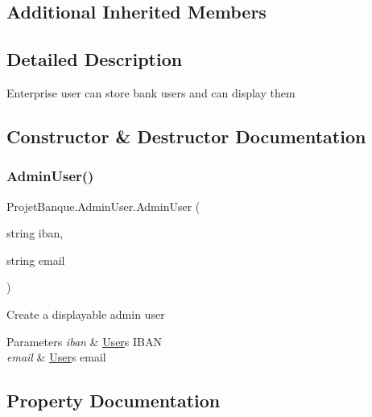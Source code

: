 \subsection*{Additional Inherited Members}


\subsection{Detailed Description}
Enterprise user can store bank users and can display them 



\subsection{Constructor \& Destructor Documentation}
\mbox{\label{class_projet_banque_1_1_admin_user_a1ab74cd3e86e062f55b3d860eb9c6356}} 
\subsubsection{\texorpdfstring{AdminUser()}{AdminUser()}}
{\footnotesize\ttfamily Projet\+Banque.\+Admin\+User.\+Admin\+User (\begin{DoxyParamCaption}\item[{string}]{iban,  }\item[{string}]{email }\end{DoxyParamCaption})}



Create a displayable admin user 


\begin{DoxyParams}{Parameters}
{\em iban} & \mbox{\hyperlink{class_projet_banque_1_1_user}{User}}\textquotesingle{}s I\+B\+AN\\
\hline
{\em email} & \mbox{\hyperlink{class_projet_banque_1_1_user}{User}}\textquotesingle{}s email\\
\hline
\end{DoxyParams}


\subsection{Property Documentation}
\mbox{\label{class_projet_banque_1_1_admin_user_a120a08108f220e1900fb56a857f6daec}} 
